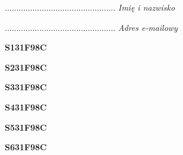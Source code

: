 \begin{turn}{90}\begin{minipage}{\linewidth} \vspace{20mm} ................................................  \textit{Imię i nazwisko}\end{minipage}\end{turn}

\begin{turn}{90}\begin{minipage}{\linewidth} \vspace{20mm} ................................................  \textit{Adres e-mailowy}\end{minipage}\end{turn}

\begin{turn}{90}\huge \begin{minipage}{\linewidth} \vspace{10mm}\textbf{S131F98C}\end{minipage}\end{turn}

\begin{turn}{90}\huge \begin{minipage}{\linewidth} \vspace{10mm}\textbf{S231F98C}\end{minipage}\end{turn}

\begin{turn}{90}\huge \begin{minipage}{\linewidth} \vspace{10mm}\textbf{S331F98C}\end{minipage}\end{turn}

\begin{turn}{90}\huge \begin{minipage}{\linewidth} \vspace{10mm}\textbf{S431F98C}\end{minipage}\end{turn}

\begin{turn}{90}\huge \begin{minipage}{\linewidth} \vspace{10mm}\textbf{S531F98C}\end{minipage}\end{turn}

\begin{turn}{90}\huge \begin{minipage}{\linewidth} \vspace{10mm}\textbf{S631F98C}\end{minipage}\end{turn}

